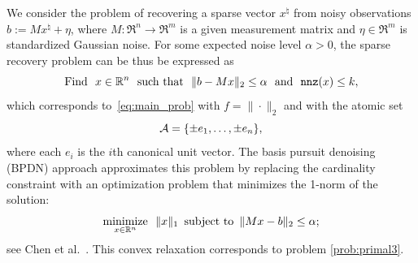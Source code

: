 \begin{example} \label{ex:bpdn}
  We consider the problem of recovering a sparse vector $x^\natural$ from noisy observations $b:=Mx^\natural + \eta$, where $M:\Re^n \to \Re^m$ is a given measurement matrix and $\eta \in \Re^m$ is standardized Gaussian noise. For some expected noise level $\alpha > 0$, the sparse recovery problem can be thus be expressed as 
  \begin{equation} \label{eq:sparse_recovery}
      \mathop{\hbox{\rm Find}}\enspace x\in\mathbb{R}^n \enspace\mathop{\hbox{\rm such that}}\enspace \|b - Mx\|_2 \leq \alpha \enspace\mathop{\hbox{\rm and}}\enspace \texttt{nnz}(x) \leq k,
  \end{equation}
  which corresponds to~\eqref{eq:main_prob} with $f=\|\cdot\|_2$ and with the atomic set
  \begin{equation}\label{eq-signed-e}
    \mathcal{A} = \{\pm e_1, \dots, \pm e_n\},
  \end{equation}
  where each $e_i$ is the $i$th canonical unit vector. The basis pursuit denoising (BPDN) approach approximates this problem by replacing the cardinality constraint with an optimization problem that minimizes the 1-norm of the solution:
  \begin{equation} \label{eq:bpdn}
    \displaystyle\mathop{\hbox{\rm minimize}}_{x\in\mathbb{R}^n}\enspace \|x\|_1  \enspace\mbox{subject to}\enspace \|Mx - b\|_2 \leq \alpha;
  \end{equation}
  see Chen et al.~\cite{cds98}. This convex relaxation corresponds to problem \eqref{prob:primal3}.
  

\end{example}
